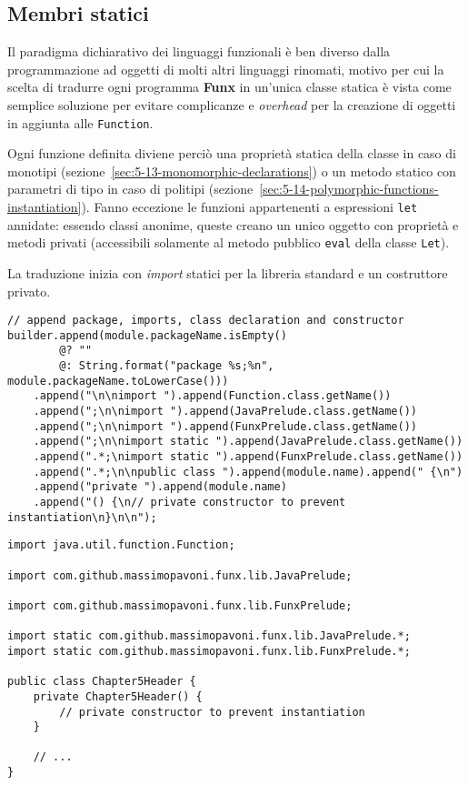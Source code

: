 \subsection{Membri statici}
\label{sec:5-11-static-members}

Il paradigma dichiarativo dei linguaggi funzionali è ben diverso dalla programmazione ad oggetti di molti altri linguaggi rinomati,
motivo per cui la scelta di tradurre ogni programma \textbf{Funx} in un'unica classe statica è vista come semplice soluzione
per evitare complicanze e \textit{overhead} per la creazione di oggetti in aggiunta alle \texttt{Function}.


Ogni funzione definita diviene perciò una proprietà statica della classe in caso di monotipi (sezione~\ref{sec:5-13-monomorphic-declarations})
o un metodo statico con parametri di tipo in caso di politipi (sezione~\ref{sec:5-14-polymorphic-functions-instantiation}).
Fanno eccezione le funzioni appartenenti a espressioni \texttt{let} annidate: essendo classi anonime, queste creano
un unico oggetto con proprietà e metodi privati (accessibili solamente al metodo pubblico \texttt{eval} della classe \texttt{Let}).

\noindent La traduzione inizia con \textit{import} statici per la libreria standard e un costruttore privato.

\vspace{4mm}
\begin{lstlisting}[caption={Prime aggiunte alla stringa \texttt{Java}}, style=javaCode, label={lst:5-11-first-append-java}]
// append package, imports, class declaration and constructor
builder.append(module.packageName.isEmpty()
        @? ""
        @: String.format("package %s;%n", module.packageName.toLowerCase()))
    .append("\n\nimport ").append(Function.class.getName())
    .append(";\n\nimport ").append(JavaPrelude.class.getName())
    .append(";\n\nimport ").append(FunxPrelude.class.getName())
    .append(";\n\nimport static ").append(JavaPrelude.class.getName())
    .append(".*;\nimport static ").append(FunxPrelude.class.getName())
    .append(".*;\n\npublic class ").append(module.name).append(" {\n")
    .append("private ").append(module.name)
    .append("() {\n// private constructor to prevent instantiation\n}\n\n");
\end{lstlisting}
\vspace{4mm}
\begin{lstlisting}[caption={Corrispondente codice \texttt{Java} generato}, style=javaCode, label={lst:5-11-class-start-java}]
import java.util.function.Function;

import com.github.massimopavoni.funx.lib.JavaPrelude;

import com.github.massimopavoni.funx.lib.FunxPrelude;

import static com.github.massimopavoni.funx.lib.JavaPrelude.*;
import static com.github.massimopavoni.funx.lib.FunxPrelude.*;

public class Chapter5Header {
    private Chapter5Header() {
        // private constructor to prevent instantiation
    }

    // ...
}
\end{lstlisting}